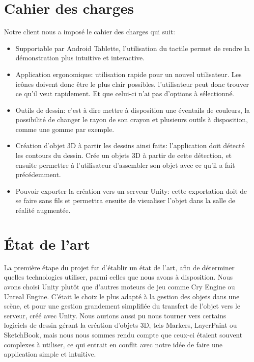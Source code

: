 \documentclass[a4paper,11pt]{article}
\begin{document}
	\section{Cahier des charges} %
		Notre client nous a imposé le cahier des charges qui suit:
		\begin{itemize}
			\item Supportable par Android Tablette, l'utilisation du tactile permet de rendre la démonstration plus intuitive et interactive.
			\item Application ergonomique: utilisation rapide pour un nouvel utilisateur. Les icônes doivent donc être le plus clair possibles, l'utilisateur peut donc trouver ce qu'il veut rapidement. Et que celui-ci n'ai pas d'options à sélectionné.
			\item Outils de dessin: c'est à dire mettre à disposition une éventails de couleurs, la possibilité de changer le rayon de son crayon et plusieurs outils à disposition, comme une gomme par exemple.
			\item Création d'objet 3D à partir les dessins ainsi faits: l'application doit détecté les contours du dessin. Crée un objets 3D à partir de cette détection, et ensuite permettre à l'utilisateur d'assembler son objet avec ce qu'il a fait précédemment.
			\item Pouvoir exporter la création vers un serveur Unity: cette exportation doit de se faire sans fils et permettra ensuite de visualiser l'objet dans la salle de réalité augmentée.
		\end{itemize}

	\section{État de l'art} %
		La première étape du projet fut d'établir un état de l'art, afin de déterminer quelles technologies utiliser, parmi celles que nous avons à disposition. Nous avons choisi Unity plutôt que d'autres moteurs de jeu comme Cry Engine ou Unreal Engine. C'était le choix le plus adapté à la gestion des objets dans une scène, et pour une gestion grandement simplifiée du transfert de l'objet vers le serveur, créé avec Unity. Nous aurions aussi pu nous tourner vers certains logiciels de dessin gérant la création d'objets 3D, tels Markers, LayerPaint ou SketchBook, mais nous nous sommes rendu compte que ceux-ci étaient souvent complexes à utiliser, ce qui entrait en conflit avec notre idée de faire une application simple et intuitive.
		
\end{document}
